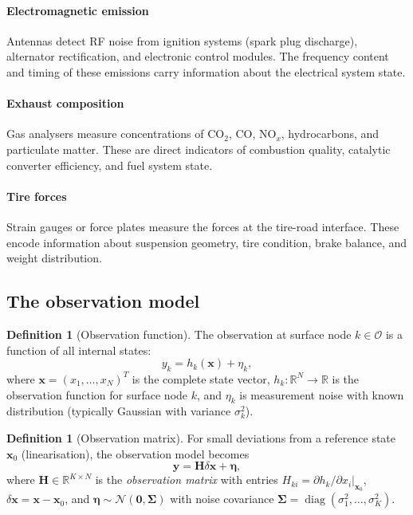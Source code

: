 \documentclass[twocolumn,10pt,a4paper]{article}
\theoremstyle{definition}
\newtheorem{definition}[theorem]{Definition}
\theoremstyle{remark}
\newcommand{\R}{\mathbb{R}}
\newcommand{\vect}[1]{\boldsymbol{#1}}
\newcommand{\mat}[1]{\mathbf{#1}}
\DeclareMathOperator{\diag}{diag}
\begin{document}
\paragraph{Electromagnetic emission} Antennas detect RF noise from ignition systems (spark plug discharge), alternator rectification, and electronic control modules. The frequency content and timing of these emissions carry information about the electrical system state.

\paragraph{Exhaust composition} Gas analysers measure concentrations of CO$_2$, CO, NO$_x$, hydrocarbons, and particulate matter. These are direct indicators of combustion quality, catalytic converter efficiency, and fuel system state.

\paragraph{Tire forces} Strain gauges or force plates measure the forces at the tire-road interface. These encode information about suspension geometry, tire condition, brake balance, and weight distribution.

\subsection{The observation model}

\begin{definition}[Observation function]\label{def:observation}
The observation at surface node $k \in \mathcal{O}$ is a function of all internal states:
\begin{equation}\label{eq:observation}
y_k = h_k(\vect{x}) + \eta_k,
\end{equation}
where $\vect{x} = (x_1, \ldots, x_N)^T$ is the complete state vector, $h_k : \R^N \to \R$ is the observation function for surface node $k$, and $\eta_k$ is measurement noise with known distribution (typically Gaussian with variance $\sigma_k^2$).
\end{definition}

\begin{definition}[Observation matrix]\label{def:observation_matrix}
For small deviations from a reference state $\vect{x}_0$ (linearisation), the observation model becomes
\begin{equation}\label{eq:linear_observation}
\vect{y} = \mat{H} \delta\vect{x} + \vect{\eta},
\end{equation}
where $\mat{H} \in \R^{K \times N}$ is the \emph{observation matrix} with entries $H_{ki} = \partial h_k / \partial x_i |_{\vect{x}_0}$, $\delta\vect{x} = \vect{x} - \vect{x}_0$, and $\vect{\eta} \sim \mathcal{N}(\vect{0}, \mat{\Sigma})$ with noise covariance $\mat{\Sigma} = \diag(\sigma_1^2, \ldots, \sigma_K^2)$.
\end{definition}
\end{document}
